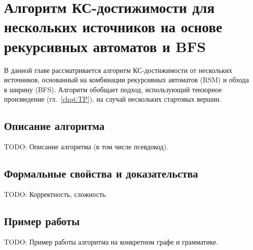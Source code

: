\setchapterpreamble[u]{\margintoc}
\chapter{Алгоритм КС-достижимости для нескольких источников на основе рекурсивных автоматов и BFS}
\label{chpt:TPMS-CFPQ}

В данной главе рассматривается алгоритм КС-достижимости от нескольких источников, основанный на комбинации рекурсивных автоматов (RSM) и обхода в ширину (BFS).
Алгоритм обобщает подход, использующий тензорное произведение (гл.~\ref{chpt:TP}), на случай нескольких стартовых вершин.

\section{Описание алгоритма}

TODO: Описание алгоритма (в том числе псевдокод).

\section{Формальные свойства и доказательства}

TODO: Корректность, сложность.

\section{Пример работы}

TODO: Пример работы алгоритма на конкретном графе и грамматике.
